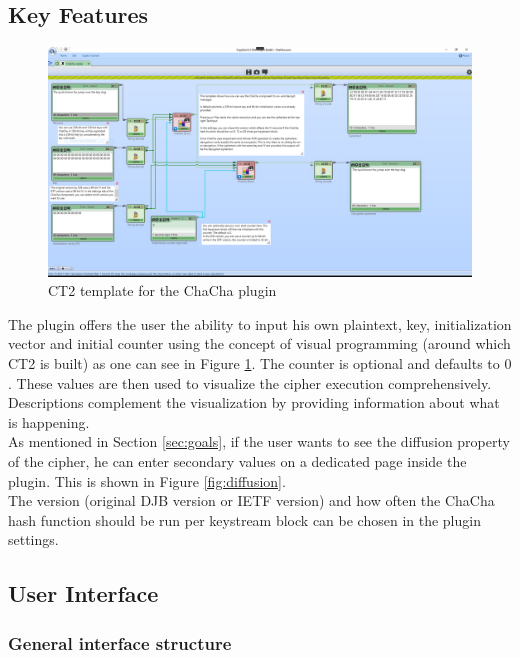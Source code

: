 
\subsection{Key Features}
\label{sec:keyFeatures}

\begin{figure}
\centering
\includegraphics[width=\textwidth]{figures/ct2/plugin-template.png}
\caption[ChaCha CT2 template]{CT2 template for the ChaCha plugin}
\label{fig:plugin.template}
\end{figure}

The plugin offers the user the ability to input his own plaintext, key, initialization vector and initial counter using the concept of visual programming (around which CT2 is built) as one can see in Figure \ref{fig:plugin.template}. The counter is optional and defaults to $0$. These values are then used to visualize the cipher execution comprehensively. Descriptions complement the visualization by providing information about what is happening. \\
As mentioned in Section \ref{sec:goals}, if the user wants to see the diffusion property of the cipher, he can enter secondary values on a dedicated page inside the plugin. This is shown in Figure \ref{fig:diffusion}. \\
The version (original DJB version or IETF version) and how often the ChaCha hash function should be run per keystream block can be chosen in the plugin settings.

\subsection{User Interface}
\label{sec:userInterface}

\subsubsection{General interface structure}

